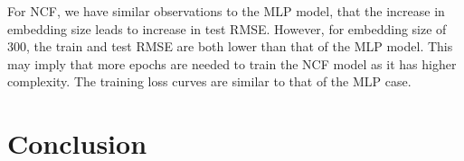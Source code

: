 \documentclass[final]{cvpr}
\begin{document}
For NCF, we have similar observations to the MLP model, that the increase in embedding size leads to increase in test RMSE. However, for embedding size of 300, the train and test RMSE are both lower than that of the MLP model. This may imply that more epochs are needed to train the NCF model as it has higher complexity. The training loss curves are similar to that of the MLP case. 

\section{Conclusion}

{\small
	
	
}
\end{document}
